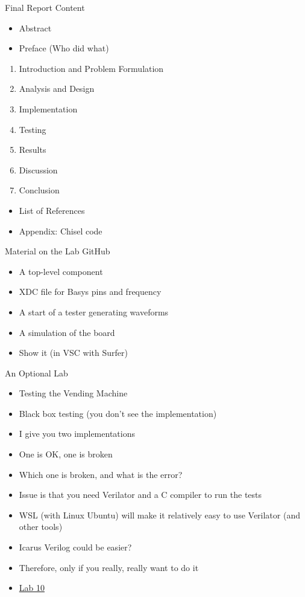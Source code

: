 \begin{frame}[fragile]{Final Report Content}
\begin{itemize}
\item Abstract
\item Preface (Who did what)
\end{itemize}
\begin{enumerate}
\item Introduction and Problem Formulation
\item Analysis and Design
\item Implementation
\item Testing
\item Results
\item Discussion
\item Conclusion
\end{enumerate}
\begin{itemize}
\item List of References
\item Appendix: Chisel code
\end{itemize}
\end{frame}


\begin{frame}[fragile]{Material on the Lab GitHub}
\begin{itemize}
\item A top-level component
\item XDC file for Basys pins and frequency
\item A start of a tester generating waveforms
\item A simulation of the board
\item Show it (in VSC with Surfer)
\end{itemize}
\end{frame}

\begin{frame}[fragile]{An Optional Lab}
\begin{itemize}
\item Testing the Vending Machine
\item Black box testing (you don't see the implementation)
\item I give you two implementations
\item One is OK, one is broken
\item Which one is broken, and what is the error?
\item Issue is that you need Verilator and a C compiler to run the tests
\item WSL (with Linux Ubuntu) will make it relatively easy to use Verilator (and other tools)
\item Icarus Verilog could be easier?
\item Therefore, only if you really, really want to do it
\item \href{https://github.com/schoeberl/chisel-lab/tree/master/lab10}{Lab 10}
\end{itemize}
\end{frame}


